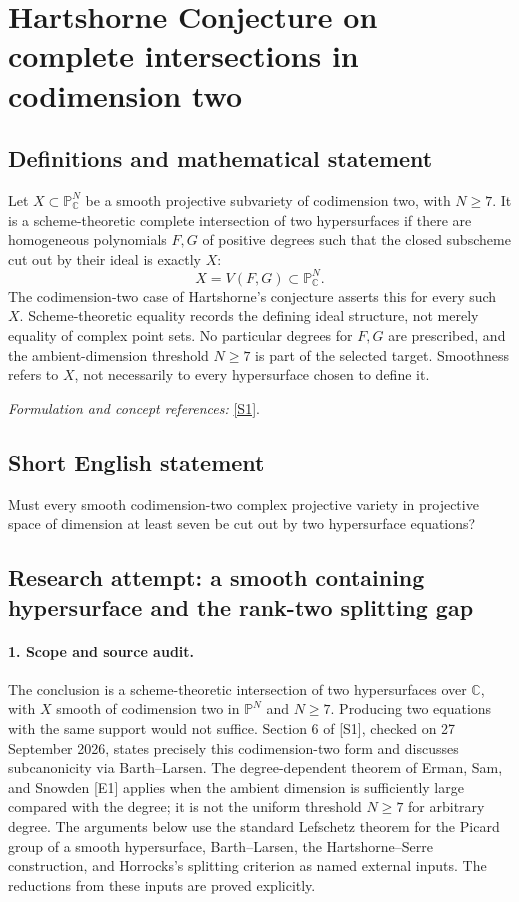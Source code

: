 \documentclass[11pt]{article}
\begin{document}
\section*{\texorpdfstring{Hartshorne Conjecture on complete intersections in codimension two}{Hartshorne Conjecture on complete intersections in codimension two}}\label{322}
\subsection{Definitions and mathematical statement}
Let $X\subset{\mathbb{P}}^N_{{\mathbb{C}}}$ be a smooth projective subvariety of codimension two, with $N\ge7$. It is a scheme-theoretic complete intersection of two hypersurfaces if there are homogeneous polynomials $F,G$ of positive degrees such that the closed subscheme cut out by their ideal is exactly $X$:
\[
 X=V(F,G)\subset{\mathbb{P}}^N_{{\mathbb{C}}}.
\]
The codimension-two case of Hartshorne's conjecture asserts this for every such $X$. Scheme-theoretic equality records the defining ideal structure, not merely equality of complex point sets. No particular degrees for $F,G$ are prescribed, and the ambient-dimension threshold $N\ge7$ is part of the selected target. Smoothness refers to $X$, not necessarily to every hypersurface chosen to define it.
\par\smallskip\textit{Formulation and concept references:} \href{https://link.springer.com/article/10.1007/s12215-024-01032-4}{[S1]}.

\subsection{Short English statement}
Must every smooth codimension-two complex projective variety in projective space of dimension at least seven be cut out by two hypersurface equations?
\subsection{Research attempt: a smooth containing hypersurface and the rank-two splitting gap}
\paragraph{1. Scope and source audit.}
The conclusion is a scheme-theoretic intersection of two hypersurfaces over $\mathbb C$, with $X$ smooth of codimension two in $\mathbb P^N$ and $N\geq7$. Producing two equations with the same support would not suffice. Section 6 of [S1], checked on 27 September 2026, states precisely this codimension-two form and discusses subcanonicity via Barth--Larsen. The degree-dependent theorem of Erman, Sam, and Snowden [E1] applies when the ambient dimension is sufficiently large compared with the degree; it is not the uniform threshold $N\geq7$ for arbitrary degree. The arguments below use the standard Lefschetz theorem for the Picard group of a smooth hypersurface, Barth--Larsen, the Hartshorne--Serre construction, and Horrocks's splitting criterion as named external inputs. The reductions from these inputs are proved explicitly.
\end{document}
